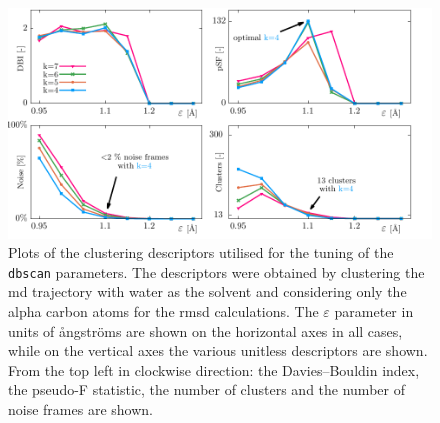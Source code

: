 \begin{figure}
\centering
\includegraphics[width=\textwidth]{sections/results/images/water_clustering_ca/to_pdf/water_clustering_ca_to_pdf.pdf}
\caption{Plots of the clustering descriptors utilised for the tuning of the  \texttt{dbscan} parameters.
The descriptors were obtained by clustering the \gls{md} trajectory with water as the solvent and considering only the alpha carbon atoms for the \gls{rmsd} calculations.
The $\varepsilon$ parameter in units of \aa{}ngstr\"oms are shown on the horizontal axes in all cases, while on the vertical axes the various unitless descriptors are shown.
From the top left in clockwise direction: the Davies--Bouldin index, the pseudo-F statistic, the number of clusters and the number of noise frames are shown.}
\label{fig:water_clustering_ca}
\end{figure}

